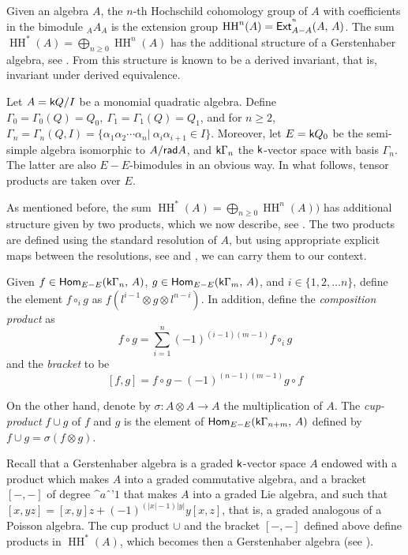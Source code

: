 \documentclass{amsart}
\theoremstyle{plain}
\theoremstyle{definition}
\begin{document}
Given an algebra $A$, the $n$-th Hochschild cohomology group of $A$ with coefficients in the bimodule $_A A_{A}$ is the extension group $\operatorname{HH}^{n}(A)={{\normalfont{\textsf{{Ext}}}}_{{A-A}}^{{^n}}({A},\,{A})}$. The sum $\operatorname{HH}^{\ast}(A)= \bigoplus_{n\geqslant 0} \operatorname{HH}^{n}(A)$ has the additional structure of a Gerstenhaber algebra, see \cite{G63}. From \cite{R89, K04} this structure is known to be a derived invariant, that is, invariant under derived equivalence.

Let $A={{\normalfont{\textsf{k}}}} Q /I$ be a monomial quadratic algebra. Define ${\Gamma}_0={\Gamma}_0(Q)=Q_0,\ {\Gamma}_1={\Gamma}_1(Q)=Q_1$, and for $n\geqslant 2$, ${\Gamma}_n={\Gamma}_n(Q,I)=\{{\alpha}_1{\alpha}_2\cdots {\alpha}_n|\ {\alpha}_i{\alpha}_{i+1}\in I\}$. Moreover, let $E={\normalfont{\textsf{{k}}}}Q_0$ be the semi-simple algebra isomorphic to $A/{{\normalfont{\textsf{{rad}}}} {A}}$, and ${\normalfont{\textsf{{k}}}}{\Gamma}_n$ the ${\normalfont{\textsf{{k}}}}$-vector space with basis ${\Gamma}_n$. The latter are also $E-E$-bimodules in an obvious way. In what follows, tensor products are taken over $E$.

As mentioned before, the sum $\operatorname{HH}^{\ast}(A) = \bigoplus_{n\geqslant 0} \operatorname{HH}^{n}(A))$ has additional structure given by two products, which we now describe, see \cite{G63}. The two products are defined using the standard resolution of $A$, but using appropriate explicit maps between the resolutions, see \cite[Section 2]{SF08} and \cite[Section 1]{B06}, we can carry them to our context.

Given $f\in {{\normalfont{\textsf{{Hom}}}}_{{E-E}}({{{\normalfont{\textsf{k}}}}{\Gamma}_n},\,{A})}$, $g\in{{\normalfont{\textsf{{Hom}}}}_{{E-E}}({{{\normalfont{\textsf{k}}}}{\Gamma}_m},\,{A})}$, and $i\in\{1,2,\ldots n\}$, define the element $f\circ_i g$ as $f \left({l}^{i-1} \otimes g \otimes {l}^{n-i}\right)$. In addition, define the \textit{composition product} as
$$f \circ g = \sum_{i=1}^n (-1)^{(i-1)(m-1)} f\circ_i g$$
and the \emph{bracket} to be
$$[f,g]= f\circ g - (-1)^{(n-1)(m-1)}g \circ f$$

On the other hand, denote by {${\sigma}\colon {A\otimes A} \to {A}$} the multiplication of $A$. The \emph{cup-product} $f\cup g$ of $f$ and $g$ is  the  element of ${{\normalfont{\textsf{{Hom}}}}_{{E-E}}({{{\normalfont{\textsf{k}}}} {\Gamma}_{n+m}},\,{A})}$ defined by $f\cup g = \sigma(f \otimes g)$.

Recall that a Gerstenhaber algebra is a graded ${{\normalfont{\textsf{k}}}}$-vector space $A$ endowed with a product which makes $A$ into a graded commutative algebra, and a bracket $[ - ,  - ]$ of degree $\^{a}1$ that makes $A$ into a graded Lie algebra, and such that $[x, yz] = [x, y]z + (-1)^{(|x|-1)|y|} y[x, z]$, that is, a graded analogous of a Poisson algebra. The cup product $\cup$ and the bracket $[ - , - ]$ defined above define products in $\operatorname{HH}^{\ast}(A)$, which becomes then a Gerstenhaber algebra (see \cite{G63}).
\end{document}
